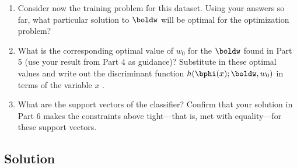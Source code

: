 \documentclass[submit]{harvardml}
\begin{document}
\begin{problem}
\begin{enumerate}
\item Consider now the training problem for this dataset. Using your
  answers so far, what particular solution to $\boldw$ will be optimal
  for the optimization problem?

\item What is the corresponding optimal value of $w_0$ for the
  $\boldw$ found in Part 5 (use your result from Part 4 as guidance)?
  Substitute in these optimal values and write out the discriminant
  function $h(\bphi(x);\boldw,w_0)$ in terms of the variable $x$ .


\item What are the support vectors of the classifier?  Confirm that
  your solution in Part 6 makes the constraints above tight---that is,
  met with equality---for these support vectors.

\end{enumerate}

\end{problem}

\subsection*{Solution}

\newpage

\end{document}
